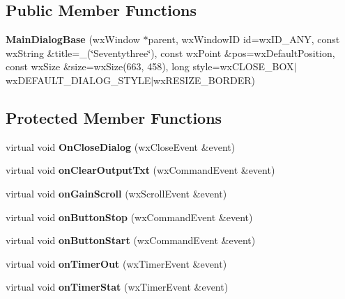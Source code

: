 \subsection*{Public Member Functions}
\begin{DoxyCompactItemize}
\item 
\mbox{\label{classMainDialogBase_a5a0347105bfbdf43f0cb282a8ffd3f3f}} 
{\bfseries Main\+Dialog\+Base} (wx\+Window $\ast$parent, wx\+Window\+ID id=wx\+I\+D\+\_\+\+A\+NY, const wx\+String \&title=\+\_\+(\char`\"{}Seventythree\char`\"{}), const wx\+Point \&pos=wx\+Default\+Position, const wx\+Size \&size=wx\+Size(663, 458), long style=wx\+C\+L\+O\+S\+E\+\_\+\+B\+OX$\vert$wx\+D\+E\+F\+A\+U\+L\+T\+\_\+\+D\+I\+A\+L\+O\+G\+\_\+\+S\+T\+Y\+LE$\vert$wx\+R\+E\+S\+I\+Z\+E\+\_\+\+B\+O\+R\+D\+ER)
\end{DoxyCompactItemize}
\subsection*{Protected Member Functions}
\begin{DoxyCompactItemize}
\item 
\mbox{\label{classMainDialogBase_a2d753c85ed39df5a546e7a9d5fa45363}} 
virtual void {\bfseries On\+Close\+Dialog} (wx\+Close\+Event \&event)
\item 
\mbox{\label{classMainDialogBase_a2904b88a4192bfa3d8a214e122849573}} 
virtual void {\bfseries on\+Clear\+Output\+Txt} (wx\+Command\+Event \&event)
\item 
\mbox{\label{classMainDialogBase_a81e778d99d7377020d385182795fca3b}} 
virtual void {\bfseries on\+Gain\+Scroll} (wx\+Scroll\+Event \&event)
\item 
\mbox{\label{classMainDialogBase_a484518dca56c0fca7767652fa01492f6}} 
virtual void {\bfseries on\+Button\+Stop} (wx\+Command\+Event \&event)
\item 
\mbox{\label{classMainDialogBase_af75b2ee75e323e469c28c2d85dcbb9f8}} 
virtual void {\bfseries on\+Button\+Start} (wx\+Command\+Event \&event)
\item 
\mbox{\label{classMainDialogBase_a9c153c9fe10fa8350d11fb09a0646779}} 
virtual void {\bfseries on\+Timer\+Out} (wx\+Timer\+Event \&event)
\item 
\mbox{\label{classMainDialogBase_a82bbbaffba00c419a848725e4c05e233}} 
virtual void {\bfseries on\+Timer\+Stat} (wx\+Timer\+Event \&event)
\end{DoxyCompactItemize}
